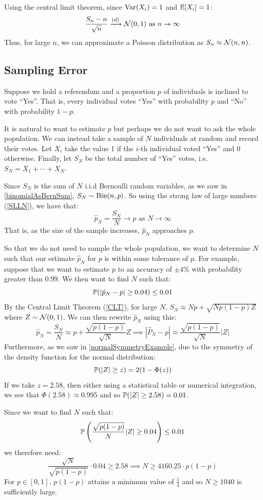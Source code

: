 \documentclass[../main.tex]{subfiles}
\begin{document}
Using the central limit theorem, since $\Var(X_i) = 1$ and $\E[X_i] = 1$:
\[
  \frac{S_n - n}{\sqrt{n}} \xrightarrow{(d)} \normal(0, 1) \text{ as } n \to \infty
\]
Thus, for large $n$, we can approximate a Poisson distribution as $S_n \approx \normal(n, n)$.
\subsection{Sampling Error}
Suppose we hold a referendum and a proportion $p$ of individuals is inclined to vote ``Yes''.
That is, every individual votes ``Yes'' with probability $p$ and ``No'' with probability $1 - p$.

It is natural to want to estimate $p$ but perhaps we do not want to ask the whole population.
We can instead take a sample of $N$ individuals at random and record their votes.
Let $X_i$ take the value 1 if the $i$-th individual voted ``Yes'' and 0 otherwise.
Finally, let $S_N$ be the total number of ``Yes'' votes, i.e. $S_N = X_1 + \cdots + X_N$.

Since $S_N$ is the sum of $N$ i.i.d Bernoulli random variables, as we saw in \cref{binomialAsBernSum}, $S_N \sim \binomial(n, p)$.
So using the strong law of large numbers (\cref{SLLN}), we have that:
\[
  \hat{p}_{N} = \frac{S_N}{N} \to p \text{ as $N \to \infty$}
\]
That is, as the size of the sample increases, $\hat{p}_{N}$ approaches $p$.

So that we do not need to sample the whole population, we want to determine $N$ such that our estimate $\hat{p}_N$ for $p$ is within some tolerance of $p$.
For example, suppose that we want to estimate $p$ to an accuracy of $\pm 4\%$ with probability greater than $0.99$.
We then want to find $N$ such that:
\[
  \P(|\hat{p}_{N} - p| \geq 0.04) \leq 0.01
\]
By the Central Limit Theorem (\cref{CLT}), for large $N$, $S_N \approx Np + \sqrt{Np(1 - p)Z}$ where $Z \sim \normal(0, 1)$.
We can then rewrite $\hat{p}_N$ using this:
\[
  \hat{p}_{N} = \frac{S_N}{N} \approx p + \frac{\sqrt{p(1 - p)}}{\sqrt{N}}Z
  \implies |\hat{P}_{N} - p| \approx \frac{\sqrt{p(1 - p)}}{\sqrt{N}} |Z|
\]
Furthermore, as we saw in \cref{normalSymmetryExample}, due to the symmetry of the density function for the normal distribution:
\[
  \P(|Z| \geq z) = 2(1 - \Phi(z))
\]
If we take $z = 2.58$, then either using a statistical table or numerical integration, we see that $\Phi(2.58) \approx 0.995$ and so $\P(|Z| \geq 2.58) = 0.01$.

Since we want to find $N$ such that:
\[
  \P\left(\frac{\sqrt{p(1 - p)}}{N} |Z| \geq 0.04\right) \leq 0.01
\]
we therefore need:
\[
  \frac{\sqrt{N}}{\sqrt{p(1 - p)}} \cdot 0.04 \geq 2.58 \implies N \geq 4160.25 \cdot p(1 - p)
\]
For $p \in [0, 1]$, $p(1 - p)$ attains a minimum value of $\frac{1}{4}$ and so $N \geq 1040$ is sufficiently large.
\end{document}
